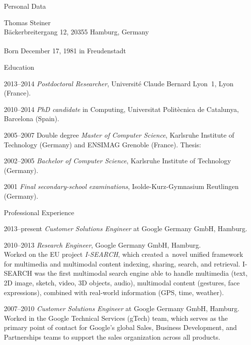 \begin{cv}{}
\begin{cvlist}{Personal Data}
	\item[]
		Thomas Steiner \\
		Bäckerbreitergang 12,
		20355 Hamburg,
		Germany\\ \\
		Born December 17, 1981 in Freudenstadt
\end{cvlist}
%
\begin{cvlist}{Education}
    \item[2013--2014] \emph{Postdoctoral Researcher}, Université Claude
      Bernard Lyon~1, Lyon (France).
    \item[2010--2014] \emph{PhD candidate} in Computing, Universitat Politècnica de Catalunya, Barcelona (Spain).
    \item[2005--2007] Double degree \emph{Master of Computer Science},
    Karlsruhe Institute of Technology (Germany) and
    ENSIMAG Grenoble (France).  
    Thesis: 
    \\[0.4\baselineskip]
    \item[2002--2005] \emph{Bachelor of Computer Science}, Karlsruhe Institute of Technology (Germany).
	\item[2001] \emph{Final secondary-school examinations}, Isolde-Kurz-Gymnasium Reutlingen (Germany).
\end{cvlist}

\begin{cvlist}{Professional Experience}
    \item[2013--present] \emph{Customer Solutions Engineer}
    at Google Germany GmbH, Hamburg.
    \item[2010--2013] \emph{Research Engineer},
    Google Germany GmbH, Hamburg.
    \\[0.4\baselineskip]
    Worked on the EU
    project \mbox{\emph{I-SEARCH}},
    which created a~novel unified framework for 
    multimedia and multimodal content indexing,
    sharing, search, and retrieval. \mbox{I-SEARCH}
    was the first multimodal search engine able to handle  
    multimedia (text, 2D image, sketch, video,
    3D objects, audio),
    multimodal content (gestures, face expressions),
    combined with real-world information
    (GPS, time, weather).
    \item[2007--2010] \emph{Customer Solutions Engineer}
    at Google Germany GmbH, Hamburg.
    \\[0.4\baselineskip]
    Worked in the Google Technical Services (gTech) team,
    which serves as the primary point of contact for
    Google's global Sales, Business Development, and
    Partnerships teams to support the sales organization
    across all products.
\end{cvlist}

\end{cv}

